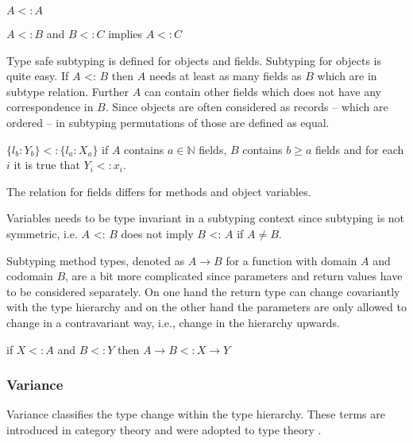\begin{defn}
	\label{def:subtypeReflexivity}
	$A <: A$
\end{defn}
\begin{defn}
	\label{def:subtypeTransitivity}
	$A <: B$ and $B <: C$ implies $A <: C$
\end{defn}

Type safe subtyping is defined for objects and fields. Subtyping for objects is
quite easy. If $A$ <: $B$ then $A$ needs at least as many fields as $B$
which are in subtype relation. Further $A$ can contain other fields
which does not have any correspondence in $B$. Since objects are often considered
as records -- which are ordered -- in subtyping permutations of those are defined
as equal. 
\begin{defn}
	\label{def:subtypeObject}
	$\{l_b : Y_b\} <: \{l_a : X_a\}$ if $A$ contains $a \in \mathbb{N}$ fields, $B$ contains
	$b \geq a$ fields and for each $i$ it is true that $Y_i <: x_i$.
\end{defn}

The relation for fields differs for methods and object variables.

Variables needs to be type invariant in a subtyping context since
subtyping is not symmetric, i.e. $A$ <: $B$ does not imply $B$ <: $A$
if $A \neq B$.

Subtyping method types, denoted as $A \rightarrow B$ for a function with
domain $A$ and codomain $B$, are a bit more complicated since parameters
and return values have to be considered separately. On one hand the return
type can change covariantly with the type hierarchy and on the other hand
the parameters are only allowed to change in a contravariant way, i.e.,
change in the hierarchy upwards.

\begin{defn}
\label{def:methodSubtyping}
if $X <: A$ and $B <: Y$ then $A \rightarrow B <: X \rightarrow Y$
\end{defn}

\subsubsection{Variance}
Variance classifies the type change within the type hierarchy. These
terms are introduced in category theory and were adopted to type theory
\cite{pierce_basic_1991}.

